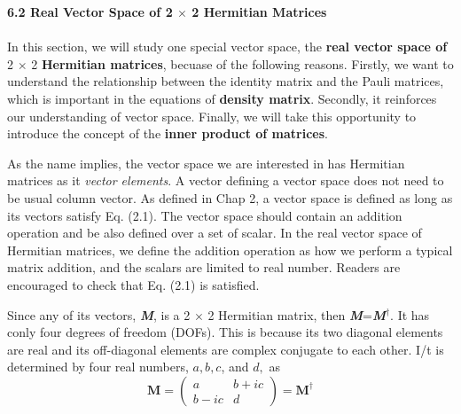 \documentclass{article}
\newcommand{\bfit}[1]{\textit{\textbf{#1}}}
\begin{document}
\textbf{\large 6.2 Real Vector Space of 2 $\times$ 2 Hermitian Matrices}\\\\
In this section, we will study one special vector space, the \textbf{real vector space of} 2 $\times$ 2
\textbf{Hermitian matrices}, becuase of the following reasons. Firstly, we want to 
understand the relationship between the identity matrix and the Pauli matrices,
which is important in the equations of \textbf{density matrix}. Secondly, it reinforces
our understanding of vector space. Finally, we will take this opportunity to introduce
the concept of the \textbf{inner product of matrices}.

As the name implies, the vector space we are interested in has Hermitian matrices
as it \textit{vector elements}. A vector defining a vector space does not need to be usual 
column vector. As defined in Chap 2, a vector space is defined as long as its vectors
satisfy Eq. (2.1). The vector space should contain an addition operation and be also defined
over a set of scalar. In the real vector space of Hermitian matrices, we define the addition operation as how we perform a typical matrix
addition, and the scalars are limited to real number. Readers are encouraged to check that 
Eq. (2.1) is satisfied.

Since any of its vectors, \bfit{M}, is a 2 $\times$ 2 Hermitian matrix, then \bfit{M}=\bfit{M}$^\dagger$.
It has conly four degrees of freedom (DOFs). This is because its two diagonal elements
are real and its off-diagonal elements are complex conjugate to each other.
I/t is determined by four real numbers, $a, b, c$, and $d,$ as
\begin{equation} \label{eq 6.1}
    \boldsymbol{M}=\begin{pmatrix}
        a & b+ic\\b-ic & d
    \end{pmatrix}
    =\boldsymbol{M}^{\dagger} \tag{6.1}
\end{equation}
\end{document}
